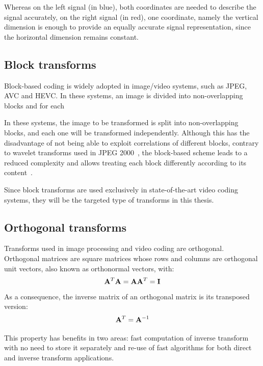 \documentclass[11pt,a4paper,openright,twoside]{book}
\numberwithin{equation}{section} %
\numberwithin{figure}{section} %
\numberwithin{table}{section} %
\begin{document}
Whereas on the left signal (in blue), both coordinates are needed to describe
the signal accurately, on the right signal (in red), one coordinate, namely
the vertical dimension is enough to provide an equally accurate signal
representation, since the horizontal dimension remains constant.

\subsection{Block transforms}
\label{sub:block_transforms}

Block-based coding is widely adopted in image/video systems, such as
\acs{JPEG}, \ac{AVC} and \ac{HEVC}.
In these systems, an image is divided into non-overlapping blocks and for each

In these systems, the image to be transformed is split into non-overlapping
blocks, and each one will be transformed independently.
Although this has the disadvantage of not being able to exploit correlations
of different blocks, contrary to wavelet transforms used in \acs{JPEG}
2000~\cite{jpeg2000}, the block-based scheme leads to a reduced complexity and
allows treating each block differently according to its
content~\cite{xu-09-intra-predictive-transforms}.

Since block transforms are used exclusively in state-of-the-art video coding
systems, they will be the targeted type of transforms in this thesis.

\subsection{Orthogonal transforms}
\label{sub:orthogonal_transforms}

Transforms used in image processing and video coding are orthogonal.
Orthogonal matrices are square matrices whose rows and columns are orthogonal
unit vectors, also known as orthonormal vectors, with:
\begin{equation}
	\mathbf{A}^T\mathbf{A} = \mathbf{A}\mathbf{A}^T = \mathbf{I}
\end{equation}
As a consequence, the inverse matrix of an orthogonal matrix is its
transposed version:
\begin{equation}
	\mathbf{A}^T = \mathbf{A}^{-1}
\end{equation}

This property has benefits in two areas: fast computation of inverse transform
with no need to store it separately and re-use of fast algorithms for both
direct and inverse transform applications.
\end{document}
